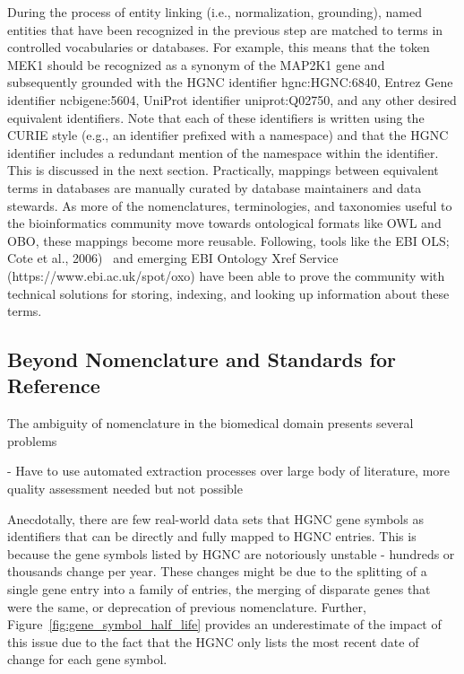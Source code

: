 During the process of entity linking (i.e., normalization, grounding), named entities that have been recognized in the previous step are matched to terms in controlled vocabularies or databases.
For example, this means that the token MEK1 should be recognized as a synonym of the MAP2K1 gene and subsequently grounded with the HGNC identifier hgnc:HGNC:6840, Entrez Gene identifier ncbigene:5604, UniProt identifier uniprot:Q02750, and any other desired equivalent identifiers.
Note that each of these identifiers is written using the \ac{CURIE} style (e.g., an identifier prefixed with a namespace) and that the HGNC identifier includes a redundant mention of the namespace within the identifier.
This is discussed in the next section.
Practically, mappings between equivalent terms in databases are manually curated by database maintainers and data stewards.
As more of the nomenclatures, terminologies, and taxonomies useful to the bioinformatics community move towards ontological formats like OWL and OBO, these mappings become more reusable.
Following, tools like the \ac{EBI} \ac{OLS}; Cote et al., 2006)~\cite{Cote2006} and emerging \ac{EBI}  Ontology Xref Service (https://www.ebi.ac.uk/spot/oxo) have been able to prove the community with technical solutions for storing, indexing, and looking up information about these terms.

\subsection{Beyond Nomenclature and Standards for Reference}

The ambiguity of nomenclature in the biomedical domain presents several problems

- Have to use automated extraction processes over large body of literature, more quality assessment needed but not possible

Anecdotally, there are few real-world data sets that HGNC gene symbols as identifiers that can be directly and fully mapped to HGNC entries.
This is because the gene symbols listed by HGNC are notoriously unstable - hundreds or thousands change per year.
These changes might be due to the splitting of a single gene entry into a family of entries, the merging of disparate genes that were the same, or deprecation of previous nomenclature.
Further, Figure~\ref{fig:gene_symbol_half_life} provides an underestimate of the impact of this issue due to the fact that the HGNC only lists the most recent date of change for each gene symbol.

